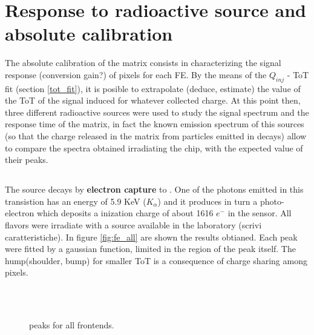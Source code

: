 \section{Response to radioactive source and absolute calibration}

The absolute calibration of the matrix consists in characterizing the signal response (conversion gain?) of pixels for each FE. By the means of the $Q_{inj}$ - ToT fit (section \ref{tot_fit}), it is posible to extrapolate (deduce, estimate) the value of the ToT of the signal induced for whatever collected charge. At this point then, three different radioactive sources were used to study the signal spectrum and the response time of the matrix, in fact the known emission spectrum of this sources (so that the charge released in the matrix from particles emitted in decays) allow to compare the spectra obtained irradiating the chip, with the expected value of their peaks. 


\subsection{}

The  source decays by \textbf{electron capture} to . One of the photons emitted in this transistion has an energy of 5.9 KeV ($K_{\alpha}$) and it produces in turn a photo-electron which deposits a inization charge of about 1616 $e^{-}$ in the sensor. 
All flavors were irradiate with a  source available in the laboratory (scrivi caratteristiche). In figure \vref{fig:fe_all} are shown the results obtianed. Each peak were fitted by a gaussian function, limited in the region of the peak itself. The hump(shoulder, bump) for smaller ToT is a consequence of charge sharing among pixels. 

\begin{figure}[h!]
\centering
{}\quad
{}\\
\quad
{}\\
\caption{ peaks for all frontends.}
\label{fig:fe_all}
\end{figure}

